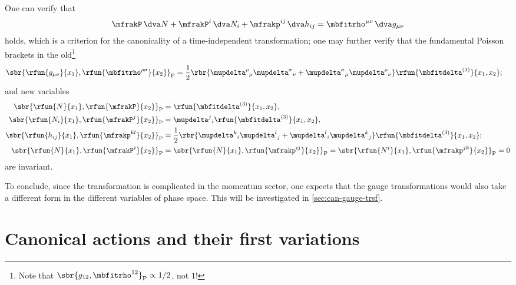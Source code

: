 \documentclass[a4paper,11pt]{article}
\begin{document}
One can verify that
\begin{align}
\mfrakP\,\dva N + \mfrakP^i\,\dva N_i + \mfrakp^{ij}\,\dva h_{ij} = 
\mbfitrho^{\mu\nu}\,\dva g_{\mu\nu}
\end{align}
holds, which is a criterion for the canonicality of a time-independent 
transformation; one may further verify that the fundamental Poisson brackets in 
the old\footnote{Note that $\sbr{g_{12}, \mbfitrho^{12}}_\text{P} \propto 
1/2$, not $1$!}
\begin{align}
\sbr{\rfun{g_{\mu\nu}}{x_1}, \rfun{\mbfitrho^{\rho\sigma}}{x_2}}_\text{P} &= 
\frac{1}{2} \rbr{
\mupdelta^\rho{}_\mu \mupdelta^\sigma{}_\nu +
\mupdelta^\sigma{}_\mu \mupdelta^\rho{}_\nu}
\rfun{\mbfitdelta^{(3)}}{x_1, x_2};
\end{align}
and new variables
\begin{align}
\begin{aligned}
\sbr{\rfun{N}{x_1}, \rfun{\mfrakP}{x_2}}_\text{P} &= 
\rfun{\mbfitdelta^{(3)}}{x_1, x_2},
\\
\sbr{\rfun{N_i}{x_1}, \rfun{\mfrakP^j}{x_2}}_\text{P} &=
\mupdelta^j{}_i
\rfun{\mbfitdelta^{(3)}}{x_1, x_2},
\\
\sbr{\rfun{h_{ij}}{x_1}, \rfun{\mfrakp^{kl}}{x_2}}_\text{P} &= 
\frac{1}{2} \rbr{
\mupdelta^k{}_i \mupdelta^l{}_j + \mupdelta^l{}_i \mupdelta^k{}_j}
\rfun{\mbfitdelta^{(3)}}{x_1, x_2};
\\
\sbr{\rfun{N}{x_1}, \rfun{\mfrakP^i}{x_2}}_\text{P} &=
\sbr{\rfun{N}{x_1}, \rfun{\mfrakp^{ij}}{x_2}}_\text{P} =
\sbr{\rfun{N^i}{x_1}, \rfun{\mfrakp^{jk}}{x_2}}_\text{P} = 0
\end{aligned}
\end{align}
are invariant.

To conclude, since the transformation is complicated in the momentum sector, 
one expects that the gauge transformations would also take a different form in 
the different variables of phase space. This will be investigated in 
\cref{sec:can-gauge-trsf}.

\section{Canonical actions and their first variations}
\label{sec:can-action-first-var}
\end{document}
